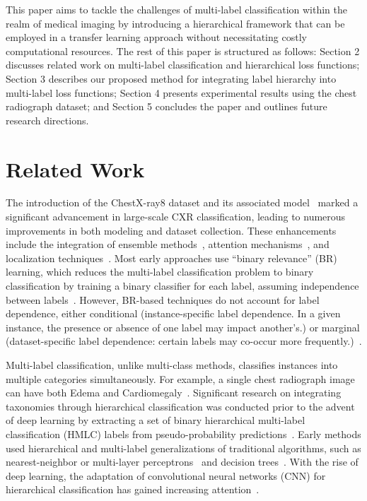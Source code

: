 This paper aims to tackle the challenges of multi-label classification within the realm of medical imaging by introducing a hierarchical framework that can be employed in a transfer learning approach without necessitating costly computational resources. The rest of this paper is structured as follows: Section 2 discusses related work on multi-label classification and hierarchical loss functions; Section 3 describes our proposed method for integrating label hierarchy into multi-label loss functions; Section 4 presents experimental results using the chest radiograph dataset; and Section 5 concludes the paper and outlines future research directions.

\section{Related Work}

The introduction of the ChestX-ray8 dataset and its associated model~\cite{wang_ChestXRay8_2017} marked a significant advancement in large-scale CXR classification, leading to numerous improvements in both modeling and dataset collection. These enhancements include the integration of ensemble methods~\cite{islam_Abnormality_2017}, attention mechanisms~\cite{guan_Diagnose_2018,liu_SDFN_2019}, and localization techniques~\cite{cai_Iterative_2018,guendel_MultiTask_2019,li_Thoracic_2018,yan_Weakly_2018}. Most early approaches use ``binary relevance'' (BR) learning, which reduces the multi-label classification problem to binary classification by training a binary classifier for each label, assuming independence between labels~\cite{zhang_Review_2014}. However, BR-based techniques do not account for label dependence, either conditional (instance-specific label dependence. In a given instance, the presence or absence of one label may impact another's.) or marginal (dataset-specific label dependence: certain labels may co-occur more frequently.)~\cite{dembczynski_Label_2012}.

Multi-label classification, unlike multi-class methods, classifies instances into multiple categories simultaneously. For example, a single chest radiograph image can have both Edema and Cardiomegaly~\cite{harvey_Standardised_2019,tsoumakas_MultiLabel_2007}. Significant research on integrating taxonomies through hierarchical classification was conducted prior to the advent of deep learning by extracting a set of binary hierarchical multi-label classification (HMLC) labels from pseudo-probability predictions~\cite{bi_BayesOptimal_2015}. Early methods used hierarchical and multi-label generalizations of traditional algorithms, such as nearest-neighbor or multi-layer perceptrons~\cite{pourghassem_ContentBased_2008} and decision trees~\cite{dimitrovski_Hierarchical_2011}. With the rise of deep learning, the adaptation of convolutional neural networks (CNN) for hierarchical classification has gained increasing attention~\cite{guo_CNNRNN_2018,kowsari_HDLTex_2017,redmon_YOLO9000_2017,roy_TreeCNN_2020}.

